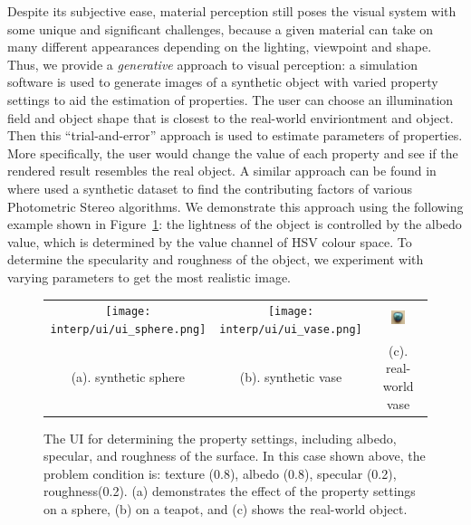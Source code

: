 Despite its subjective ease, material perception still poses the visual system with some unique and significant challenges, because a given material can take on many different appearances depending on the lighting, viewpoint and shape. Thus, we provide a \textit{generative} approach to visual perception: a simulation software is used to generate images of a synthetic object with varied property settings to aid the estimation of properties. The user can choose an illumination field and object shape that is closest to the real-world enviriontment and object. Then this ``trial-and-error'' approach is used to estimate parameters of properties. More specifically, the user would change the value of each property and see if the rendered result resembles the real object. A similar approach can be found in~\cite{Berkiten:2016:ARB} where \citeauthor{Berkiten:2016:ARB} used a synthetic dataset to find the contributing factors of various Photometric Stereo algorithms. We demonstrate this approach using the following example shown in Figure~\ref{fig:prop_estimate}:  the lightness of the object is controlled by the albedo value, which is determined by the value channel of HSV colour space. To determine the specularity and roughness of the object, we experiment with varying parameters to get the most realistic image.
\begin{figure}[!htbp]
\centering
\begin{tabular}{ccc}
  \texttt{[image: interp/ui/ui\_sphere.png]}&
  \texttt{[image: interp/ui/ui\_vase.png]}&
  \includegraphics[width=0.3\textwidth]{img/interp/real_world_img/vase/vase.jpg}\\
  (a). synthetic sphere & (b). synthetic vase & (c). real-world vase\\
\end{tabular}
\caption{The UI for determining the property settings, including albedo, specular, and roughness of the surface. In this case shown above, the problem condition is: texture (0.8), albedo (0.8), specular (0.2), roughness(0.2). (a) demonstrates the effect of the property settings on a sphere, (b) on a teapot, and (c) shows the real-world object.}
\label{fig:prop_estimate}
\end{figure}

